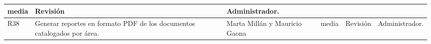 \begin{center}
\begin{longtable}{|p{0.5cm}|p{3cm}|p{2cm}|p{0.8cm}|p{1.5cm}|p{2cm}|}
media
	&

Revisión
	&

Administrador.\\
\hline
R38
	&

Generar reportes en formato PDF de los documentos catalogados por área.
	&

Marta Millán y Mauricio Gaona
	&

media
	&

Revisión
	&

Administrador.\\
\hline


\end{longtable}
\end{center}

% 